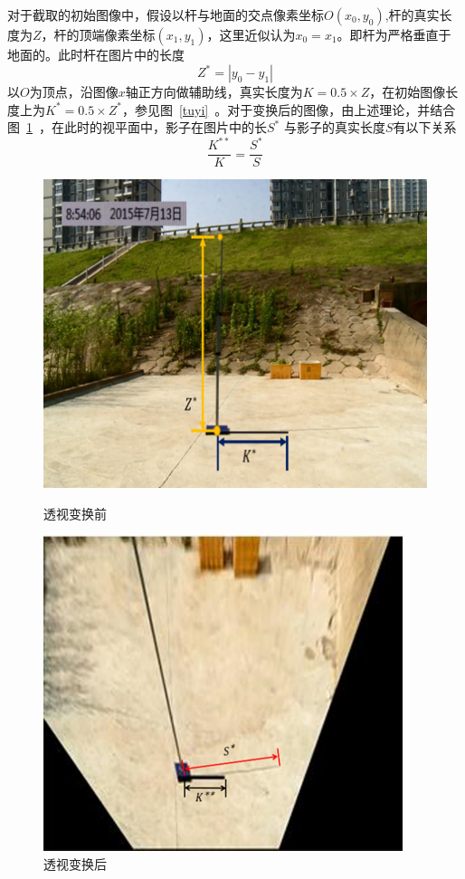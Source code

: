 \documentclass[12pt]{cumcmart}   %
\begin{document}
对于截取的初始图像中，假设以杆与地面的交点像素坐标$O(x_0,y_0)$,杆的真实长度为$Z$，杆的顶端像素坐标$(x_1,y_1)$，这里近似认为$x_0=x_1$。即杆为严格垂直于地面的。此时杆在图片中的长度
\begin{equation}
Z^*=|y_0-y_1|
\end{equation}
以$O$为顶点，沿图像$x$轴正方向做辅助线，真实长度为$K=0.5\times Z $，在初始图像长度上为$K^*=0.5\times Z^*$，参见图~\ref{tuyi}~。对于变换后的图像，由上述理论，并结合图~\ref{tuer}~，在此时的视平面中，影子在图片中的长$S^*$ 与影子的真实长度$S$有以下关系
\begin{equation}
\frac{{{K^{**}}}}{K} = \frac{{{S^*}}}{S}
\end{equation}
\begin{figure}[h]
	\centering
	\begin{minipage}{.45\textwidth}
		\centering
		\includegraphics[width=.95\textwidth]{images/tuyi.png}
		\caption{透视变换前}
		\label{tuyi}
	\end{minipage}\hfill
	\begin{minipage}{.45\textwidth}
		\centering
		\includegraphics[width=.95\textwidth]{images/tuer.png}
		\caption{透视变换后}
		\label{tuer}
	\end{minipage}	
\end{figure}
\end{document}
